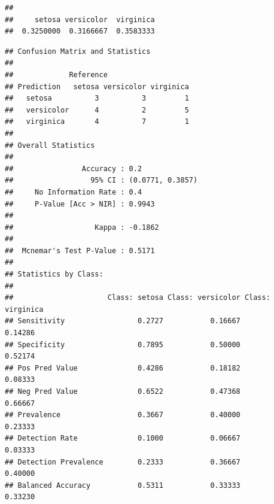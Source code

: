 \documentclass[]{book}
\newenvironment{Shaded}{\begin{snugshade}}{\end{snugshade}}
\newcommand{\KeywordTok}[1]{\textcolor[rgb]{0.13,0.29,0.53}{\textbf{#1}}}
\newcommand{\DataTypeTok}[1]{\textcolor[rgb]{0.13,0.29,0.53}{#1}}
\newcommand{\StringTok}[1]{\textcolor[rgb]{0.31,0.60,0.02}{#1}}
\newcommand{\CommentTok}[1]{\textcolor[rgb]{0.56,0.35,0.01}{\textit{#1}}}
\newcommand{\OtherTok}[1]{\textcolor[rgb]{0.56,0.35,0.01}{#1}}
\newcommand{\OperatorTok}[1]{\textcolor[rgb]{0.81,0.36,0.00}{\textbf{#1}}}
\newcommand{\NormalTok}[1]{#1}
\theoremstyle{break}
\theoremstyle{definition}
\theoremstyle{definition}
\theoremstyle{definition}
\theoremstyle{remark}
\begin{document}
\begin{verbatim}
## 
##     setosa versicolor  virginica 
##  0.3250000  0.3166667  0.3583333
\end{verbatim}

\begin{Shaded}
\end{Shaded}

\begin{verbatim}
## Confusion Matrix and Statistics
## 
##             Reference
## Prediction   setosa versicolor virginica
##   setosa          3          3         1
##   versicolor      4          2         5
##   virginica       4          7         1
## 
## Overall Statistics
##                                           
##                Accuracy : 0.2             
##                  95% CI : (0.0771, 0.3857)
##     No Information Rate : 0.4             
##     P-Value [Acc > NIR] : 0.9943          
##                                           
##                   Kappa : -0.1862         
##                                           
##  Mcnemar's Test P-Value : 0.5171          
## 
## Statistics by Class:
## 
##                      Class: setosa Class: versicolor Class: virginica
## Sensitivity                 0.2727           0.16667          0.14286
## Specificity                 0.7895           0.50000          0.52174
## Pos Pred Value              0.4286           0.18182          0.08333
## Neg Pred Value              0.6522           0.47368          0.66667
## Prevalence                  0.3667           0.40000          0.23333
## Detection Rate              0.1000           0.06667          0.03333
## Detection Prevalence        0.2333           0.36667          0.40000
## Balanced Accuracy           0.5311           0.33333          0.33230
\end{verbatim}
\end{document}
